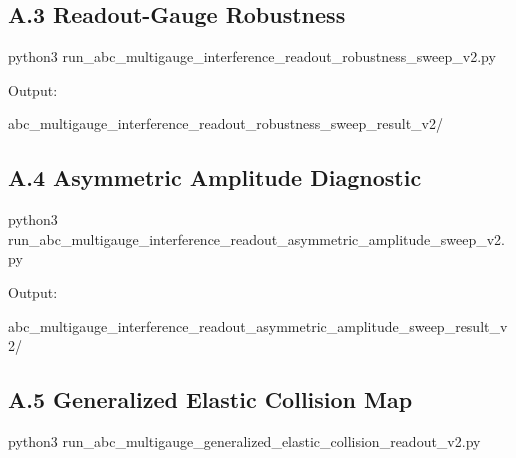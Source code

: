 \documentclass[
  a4paper,
]{article}
\newenvironment{Shaded}{}{}
\newcommand{\NormalTok}[1]{#1}
\begin{document}
\subsection{A.3 Readout-Gauge
Robustness}\label{a.3-readout-gauge-robustness}

\begin{Shaded}
\begin{Highlighting}[]
\NormalTok{python3 run\_abc\_multigauge\_interference\_readout\_robustness\_sweep\_v2.py}
\end{Highlighting}
\end{Shaded}

Output:

\begin{Shaded}
\begin{Highlighting}[]
\NormalTok{abc\_multigauge\_interference\_readout\_robustness\_sweep\_result\_v2/}
\end{Highlighting}
\end{Shaded}

\subsection{A.4 Asymmetric Amplitude
Diagnostic}\label{a.4-asymmetric-amplitude-diagnostic}

\begin{Shaded}
\begin{Highlighting}[]
\NormalTok{python3 run\_abc\_multigauge\_interference\_readout\_asymmetric\_amplitude\_sweep\_v2.py}
\end{Highlighting}
\end{Shaded}

Output:

\begin{Shaded}
\begin{Highlighting}[]
\NormalTok{abc\_multigauge\_interference\_readout\_asymmetric\_amplitude\_sweep\_result\_v2/}
\end{Highlighting}
\end{Shaded}

\subsection{A.5 Generalized Elastic Collision
Map}\label{a.5-generalized-elastic-collision-map}

\begin{Shaded}
\begin{Highlighting}[]
\NormalTok{python3 run\_abc\_multigauge\_generalized\_elastic\_collision\_readout\_v2.py}
\end{Highlighting}
\end{Shaded}
\end{document}
